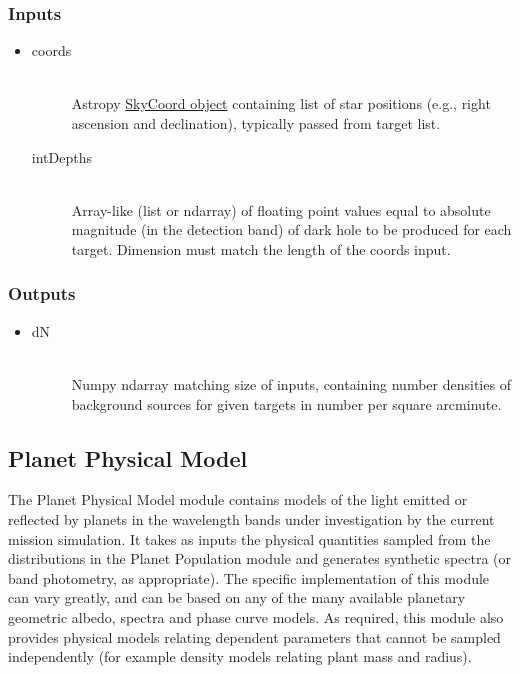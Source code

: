 \documentclass[cleanfoot]{asme2ej}
\begin{document}
\subsubsection*{Inputs}
\begin{itemize}
    \item 
    \begin{description}
        \item[coords] \hfill \\
        Astropy \href{http://astropy.readthedocs.org/en/latest/api/astropy.coordinates.SkyCoord.html}{SkyCoord object} containing list of star positions (e.g., right ascension and declination), typically passed from target list.
        \item[intDepths] \hfill \\
        Array-like (list or ndarray) of floating point values equal to absolute magnitude (in the detection band) of dark hole to be produced for each target. Dimension must match the length of the coords input.
    \end{description}
\end{itemize}

\subsubsection*{Outputs}
\begin{itemize}
    \item 
    \begin{description}
        \item[dN] \hfill \\
        Numpy ndarray matching size of inputs, containing number densities of background sources for given targets in number per square arcminute.
    \end{description}
\end{itemize}



\subsection{Planet Physical Model} \label{sec:planetphysicalmodel}
The Planet Physical Model module contains models of the light emitted or reflected by planets in the wavelength bands under investigation by the current mission simulation.  It takes as inputs the physical quantities sampled from the distributions in the Planet Population module and generates synthetic spectra (or band photometry, as appropriate).  The specific implementation of this module can vary greatly, and can be based on any of the many available planetary geometric albedo, spectra and phase curve models.  As required, this module also provides physical models relating dependent parameters that cannot be sampled independently (for example density models relating plant mass and radius).
\end{document}
